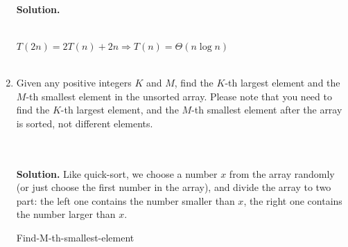 \documentclass{article}
\newtheorem*{solution}{Solution}
\renewenvironment{solution}[1][Solution]{~\\ \textbf{#1.}}{~\\}
\begin{document}
\begin{enumerate}
\begin{solution}
\begin{minipage}[H]{0.8\textwidth}
\begin{algorithm}[H]
        \end{algorithm}
    \end{minipage}\\
    $T(2n)=2T(n)+2n\Rightarrow T(n)=\Theta(n\log n)$
\end{solution}
~\\
\newpage
\item Given any positive integers $K$ and $M$, find the $K$-th largest element and the $M$-th smallest element in the unsorted array. Please note that you need to find the $K$-th largest element, and the $M$-th smallest element after the array is sorted, not different elements.

~\\
\begin{solution}
    Like quick-sort, we choose a number $x$ from the array randomly (or just choose the first number in the array), and divide the array to two part: the left one contains the number smaller than $x$, the right one contains the number larger than $x$. \\
    \begin{minipage}[H]{0.8\textwidth}
        \begin{algorithm}[H]
            \caption{Find-M-th-smallest-element}
            \label{quicksort-divide}
            \BlankLine
        \end{algorithm}
    \end{minipage}\\

\end{solution}
\end{enumerate}
\end{document}
